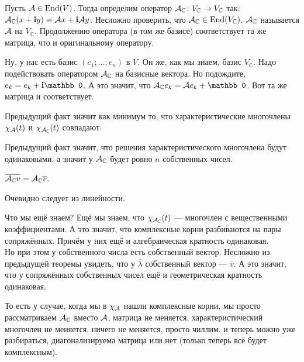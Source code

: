 \documentclass{article}
\begin{document}
\begin{itemize}
\begin{Proof}
        \end{Proof}
        \dfn Пусть ${\mathcal{A}}\in\operatorname{End}(V)$. Тогда определим оператор ${\mathcal{A}}_\mathbb C\colon V_\mathbb C\to V_\mathbb C$ так: ${\mathcal{A}}_\mathbb C(x+{\mathbf i} y)={\mathcal{A}} x+{\mathbf i}{\mathcal{A}} y$. Несложно проверить, что ${\mathcal{A}}_\mathbb C\in\operatorname{End}(V_\mathbb C)$. ${\mathcal{A}}_\mathbb C$ называется  ${\mathcal{A}}$ на $V_\mathbb C$.
        \thm Продолжению оператора (в том же базисе) соответствует та же матрица, что и оригинальному оператору.
        \begin{Proof}
            Ну, у нас есть базис $(e_1;\ldots;e_n)$ в $V$. Он же, как мы знаем, базис $V_\mathbb C$. Надо подействовать оператором ${\mathcal{A}}_\mathbb C$ на базисные вектора. Но подождите, $e_k=e_k+\im\mathbb0$. А это значит, что $\scriptA_\mathbb Ce_k=\scriptA e_k+\mathbb0$. Вот та же матрица и соответствует.
        \end{Proof}
        \thm Предыдущий факт значит как минимум то, что характеристические многочлены $\chi_{\mathcal{A}}(t)$ и $\chi_{{\mathcal{A}}_\mathbb C}(t)$ совпадают.
        \begin{Comment}
            Предыдущий факт значит, что решения характеристического многочлена будут одинаковыми, а значит у ${\mathcal{A}}_\mathbb C$ будет ровно $n$ собственных чисел.
        \end{Comment}
        \thm $\overline{{\mathcal{A}}_\mathbb Cv}={\mathcal{A}}_\mathbb C\overline v$.
        \begin{Proof}
            Очевидно следует из линейности.
        \end{Proof}
        \begin{Comment}
            Что мы ещё знаем? Ещё мы знаем, что $\chi_{{\mathcal{A}}_\mathbb C}(t)$ --- многочлен с вещественными коэффициентами. А это значит, что комплексные корни разбиваются на пары сопряжённых. Причём у них ещё и алгебраическая кратность одинаковая.\\
            Но при этом у собственного числа есть собственный вектор. Несложно из предыдущей теоремы увидеть, что у $\overline\lambda$ собственный вектор --- $\overline v$. А это значит, что у сопряжённых собственных чисел ещё и геометрическая кратность одинаковая.
        \end{Comment}
        \begin{Comment}
            То есть у случае, когда мы в $\chi_{\mathcal{A}}$ нашли комплексные корни, мы просто рассматриваем ${\mathcal{A}}_\mathbb C$ вместо ${\mathcal{A}}$, матрица не меняется, характеристический многочлен не меняется, ничего не меняется, просто чиллим. и теперь можно уже разбираться, диагонализируема матрица или нет (только теперь всё будет комплексным).
        \end{Comment}
    \end{itemize}
\end{document}
